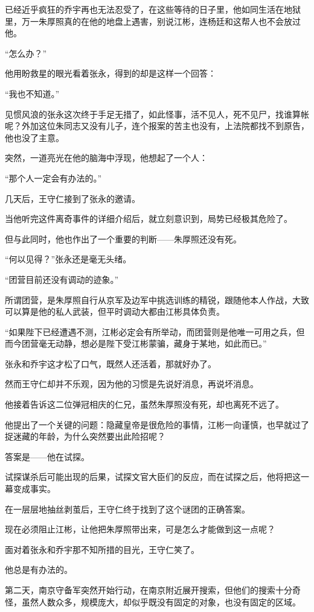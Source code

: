 \begin{multicols}{\theparacolNo}
		已经近乎疯狂的乔宇再也无法忍受了，在这些等待的日子里，他如同生活在地狱里，万一朱厚照真的在他的地盘上遇害，别说江彬，连杨廷和这帮人也不会放过他。

		“怎么办？”

		他用盼救星的眼光看着张永，得到的却是这样一个回答：

		“我也不知道。”

		见惯风浪的张永这次终于手足无措了，如此怪事，活不见人，死不见尸，找谁算帐呢？外加这位朱同志又没有儿子，连个报案的苦主也没有，上法院都找不到原告，他也没了主意。

		突然，一道亮光在他的脑海中浮现，他想起了一个人：

		“那个人一定会有办法的。”

		几天后，王守仁接到了张永的邀请。

		当他听完这件离奇事件的详细介绍后，就立刻意识到，局势已经极其危险了。

		但与此同时，他也作出了一个重要的判断——朱厚照还没有死。

		“何以见得？”张永还是毫无头绪。

		“团营目前还没有调动的迹象。”

		所谓团营，是朱厚照自行从京军及边军中挑选训练的精锐，跟随他本人作战，大致可以算是他的私人武装，但平时调动大都由江彬具体负责。

		“如果陛下已经遭遇不测，江彬必定会有所举动，而团营则是他唯一可用之兵，但而今团营毫无动静，想必是陛下受江彬蒙骗，藏身于某地，如此而已。”

		张永和乔宇这才松了口气，既然人还活着，那就好办了。

		然而王守仁却并不乐观，因为他的习惯是先说好消息，再说坏消息。

		他接着告诉这二位弹冠相庆的仁兄，虽然朱厚照没有死，却也离死不远了。

		他提出了一个关键的问题：隐藏皇帝是很危险的事情，江彬一向谨慎，也早就过了捉迷藏的年龄，为什么突然要出此险招呢？

		答案是——他在试探。

		试探谋杀后可能出现的后果，试探文官大臣们的反应，而在试探之后，他将把这一幕变成事实。

		在一层层地抽丝剥茧后，王守仁终于找到了这个谜团的正确答案。

		现在必须阻止江彬，让他把朱厚照带出来，可是怎么才能做到这一点呢？

		面对着张永和乔宇那不知所措的目光，王守仁笑了。

		他总是有办法的。

		第二天，南京守备军突然开始行动，在南京附近展开搜索，但他们的搜索十分奇怪，虽然人数众多，规模庞大，却似乎既没有固定的对象，也没有固定的区域。


\end{multicols}
